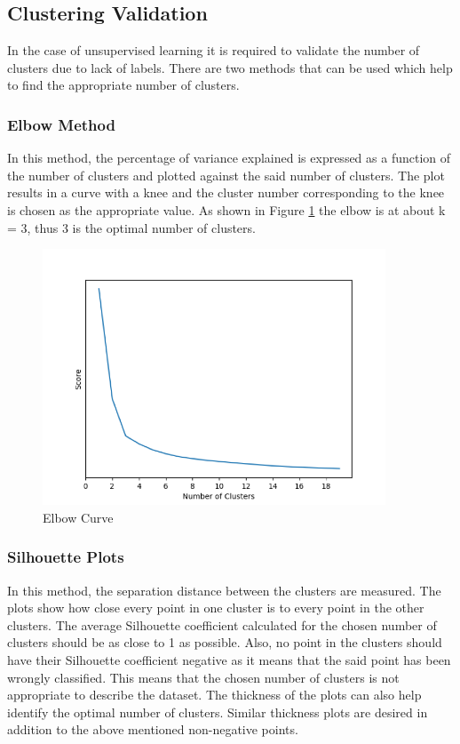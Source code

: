 \documentclass[12pt]{article}
\begin{document}
\subsection{Clustering Validation}
In the case of unsupervised learning it is required to validate the number of clusters due to lack of labels. There are two methods that can be used which help to find the appropriate number of clusters.

\subsubsection{Elbow Method}
In this method, the percentage of variance explained is expressed as a function of the number of clusters and plotted against the said number of clusters. The plot results in a curve with a knee and the cluster number corresponding to the knee is chosen as the appropriate value. As shown in Figure \ref{fig:nCluster} the elbow is at about k = 3, thus 3 is the optimal number of clusters. 
\begin{figure}[H]
	\centering
	\includegraphics[height=3in]{nCluster}
	\caption[]{Elbow Curve}
	\label{fig:nCluster}
\end{figure}

\subsubsection{Silhouette Plots}
In this method, the separation distance between the clusters are measured. The plots show how close every point in one cluster is to every point in the other clusters. The average Silhouette coefficient calculated for the chosen number of clusters should be as close to 1 as possible. Also, no point in the clusters should have their Silhouette coefficient negative as it means that the said point has been wrongly classified. This means that the chosen number of clusters is not appropriate to describe the dataset. The thickness of the plots can also help identify the optimal number of clusters. Similar thickness plots are desired in addition to the above mentioned non-negative points.
\end{document}
